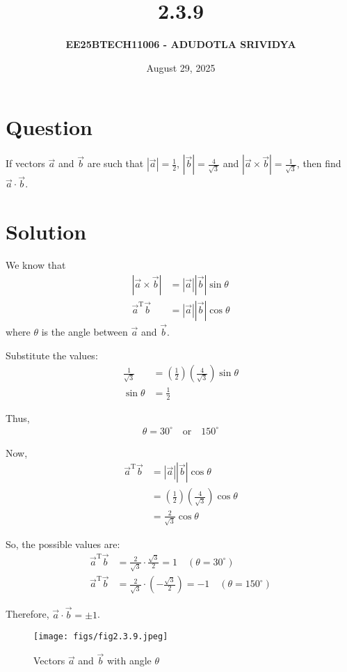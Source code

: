 \documentclass[journal]{IEEEtran}
\title{\textbf{2.3.9}}
\author{\textbf{EE25BTECH11006 - ADUDOTLA SRIVIDYA}}
\date{August 29, 2025}
\begin{document}
\maketitle

\section*{\textbf{Question}}
If vectors $\vec{a}$ and $\vec{b}$ are such that $|\vec{a}| = \frac{1}{2}$, $|\vec{b}| = \frac{4}{\sqrt{3}}$ and $|\vec{a} \times \vec{b}| = \frac{1}{\sqrt{3}}$, then find $\vec{a} \cdot \vec{b}$.

\section*{\textbf{Solution}}
We know that
\begin{align}
|\vec{a} \times \vec{b}| &= |\vec{a}||\vec{b}|\sin\theta \\
\vec{a}^{\mathrm{T}} \vec{b} &= |\vec{a}||\vec{b}|\cos\theta
\end{align}
where $\theta$ is the angle between $\vec{a}$ and $\vec{b}$.

\noindent
Substitute the values:
\begin{align}
\frac{1}{\sqrt{3}} &= \left(\frac{1}{2}\right)\left(\frac{4}{\sqrt{3}}\right)\sin\theta \\
\sin\theta &= \frac{1}{2}
\end{align}

Thus,
\begin{align}
\theta = 30^\circ \quad \text{or} \quad 150^\circ
\end{align}

\noindent
Now,
\begin{align}
\vec{a}^{\mathrm{T}} \vec{b} &= |\vec{a}||\vec{b}|\cos\theta \\
&= \left(\frac{1}{2}\right)\left(\frac{4}{\sqrt{3}}\right)\cos\theta \\
&= \frac{2}{\sqrt{3}}\cos\theta
\end{align}

\noindent
So, the possible values are:
\begin{align}
\vec{a}^{\mathrm{T}} \vec{b} &= \frac{2}{\sqrt{3}} \cdot \frac{\sqrt{3}}{2} = 1 \quad (\theta = 30^\circ) \\
\vec{a}^{\mathrm{T}} \vec{b} &= \frac{2}{\sqrt{3}} \cdot \left(-\frac{\sqrt{3}}{2}\right) = -1 \quad (\theta = 150^\circ)
\end{align}

\centering
Therefore, $\vec{a} \cdot \vec{b} = \pm 1$.
\newpage
\begin{figure}[H]
    \centering
    \texttt{[image: figs/fig2.3.9.jpeg]}
    \caption{Vectors $\vec{a}$ and $\vec{b}$ with angle $\theta$}
    \label{fig:placeholder}
\end{figure}
\end{document}
